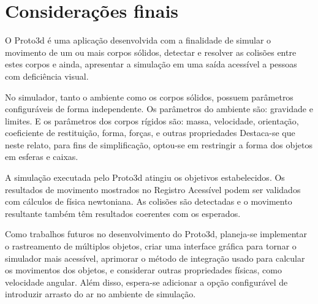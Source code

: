 \documentclass[12pt]{article}
\begin{document}
\section{Considerações finais}
O Proto3d é uma aplicação desenvolvida com a finalidade de simular o movimento de um ou mais corpos sólidos, detectar e resolver as colisões entre estes corpos e ainda, apresentar a simulação em uma saída acessível a pessoas com deficiência visual.

No simulador, tanto o ambiente como os corpos sólidos, possuem parâmetros configuráveis de forma independente. Os parâmetros do ambiente são:  gravidade e limites. E os parâmetros dos corpos rígidos são: massa, velocidade, orientação, coeficiente de restituição, forma, forças, e outras propriedades Destaca-se que neste relato, para fins de simplificação, optou-se em restringir a forma dos objetos em esferas e caixas.

A simulação executada pelo Proto3d atingiu os objetivos estabelecidos. Os resultados de movimento mostrados no Registro Acessível podem ser validados com cálculos de física newtoniana. As colisões são detectadas e o movimento resultante também têm resultados coerentes com os esperados. 

Como trabalhos futuros no desenvolvimento do Proto3d, planeja-se implementar o rastreamento de múltiplos objetos, criar uma interface gráfica para tornar o simulador mais acessível, aprimorar o método de integração usado para calcular os movimentos dos objetos, e considerar outras propriedades físicas, como velocidade angular. Além disso, espera-se adicionar a opção configurável de introduzir arrasto do ar no ambiente de simulação.



\end{document}
